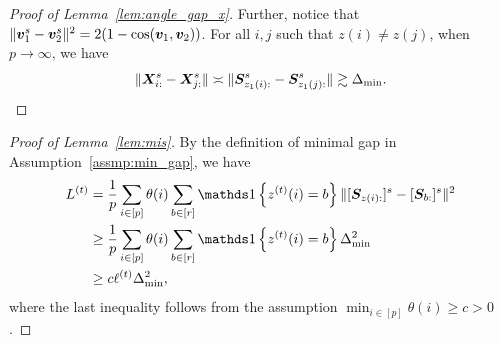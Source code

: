 \documentclass[journal]{IEEEtran}
\theoremstyle{definition}
\theoremstyle{definition}
\newcommand{\offf}[1]{\left\{#1\right\}}
\newcommand{\ang}[1]{\left\langle#1\right\rangle}
\begin{document}
\begin{proof}[Proof of Lemma~\ref{lem:angle_gap_x}]
{Further, notice that $\lVert\bm{v}_1^s - \bm{v}_2^s\rVert^2 =  2(1 - \cos(\bm{v}_1, \bm{v}_2))$. For all $i,j$ such that $z(i) \neq z(j)$, when $p \rightarrow \infty$, we have
\begin{equation}
    \lVert\bm X_{i:}^s - \bm X_{j:}^s\rVert \asymp \lVert\bm S_{z_1(i):}^s - \bm S_{z_1(j):}^s\rVert \gtrsim  \Delta_{\min}.
\end{equation} 


}



\end{proof}

\begin{proof}[Proof of Lemma~\ref{lem:mis}]
By the definition of minimal gap in Assumption~\ref{assmp:min_gap}, we have 
\begin{align}
     L^{(t)} &= \frac{1}{p}  \sum_{i \in [p]} \theta(i) \sum_{b \in [r]}  \ind \offf{ z^{(t)}(i) = b } \onormSize{}{ [ \mS_{ z(i):}  ]^s - [ \mS_{b:}  ]^s  }^2 \\
     &\geq \frac{1}{p}  \sum_{i \in [p]} \theta(i) \sum_{b \in [r]}  \ind \offf{ z^{(t)}(i) = b } \Delta_{\min}^2 \\
     & \geq c \ell^{(t)} \Delta_{\min}^2,
\end{align}
    where the last inequality follows from the assumption $\min_{i \in [p]} \theta(i) \geq c>0$.
\end{proof}
\end{document}

